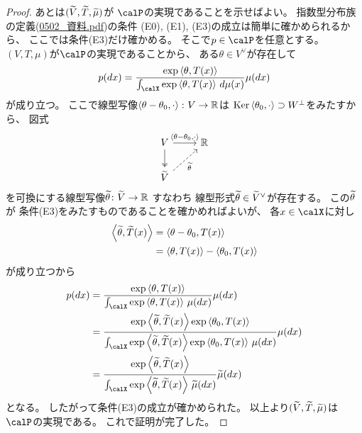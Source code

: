 \documentclass[report]{jlreq}
\begin{document}
\begin{proof}
    あとは$(\widetilde{V}, \widetilde{T}, \widetilde{\mu})$が
    $\calP$の実現であることを示せばよい。
    指数型分布族の定義(\url{0502_資料.pdf})の条件
    (E0), (E1), (E3)の成立は簡単に確かめられるから、
    ここでは条件(E3)だけ確かめる。
    そこで$p \in \calP$を任意とする。
    $(V, T, \mu)$が$\calP$の実現であることから、
    ある$\theta \in V^\vee$が存在して
    \begin{equation}
        p(dx) =
            \frac{
                \exp\myangle{\theta}{T(x)}
            }{
                \int_\calX \exp\myangle{\theta}{T(x)} \, d\mu(x)
            }
            \mu(dx)
    \end{equation}
    が成り立つ。
    ここで線型写像$\left\langle{\theta - \theta_0},{\cdot}\right\rangle \colon V \to \mathbb{R}$は
    $\operatorname{\mathrm{Ker}} \left\langle{\theta_0},{\cdot}\right\rangle \supset W^\perp$をみたすから、
    図式
    \begin{equation}
        \begin{tikzcd}
            V
                \ar[two heads]{d}
                \ar{r}{\myangle{\theta - \theta_0}{\cdot}}
                & \R
                \\
            \wt{V}
                \ar[dashed]{ru}[swap]{\wt{\theta}}
        \end{tikzcd}
    \end{equation}
    を可換にする線型写像$\widetilde{\theta} \colon \widetilde{V} \to \mathbb{R}$
    すなわち
    線型形式$\widetilde{\theta} \in \widetilde{V}^\vee$が存在する。
    この$\widetilde{\theta}$が
    条件(E3)をみたすものであることを確かめればよいが、
    各$x \in \calX$に対し
    \begin{alignat}{1}
        \left\langle{\widetilde{\theta}},{\widetilde{T}(x)}\right\rangle
            &=
                \left\langle{\theta - \theta_0},{T(x)}\right\rangle
                \\
            &=
                \left\langle{\theta},{T(x)}\right\rangle
                -
                \left\langle{\theta_0},{T(x)}\right\rangle
    \end{alignat}
    が成り立つから
    \begin{alignat}{1}
        p(dx)
            &=
                \frac{
                    \exp\myangle{\theta}{T(x)}
                }{
                    \int_\calX
                    \exp\myangle{\theta}{T(x)}
                    \, \mu(dx)
                }
                \mu(dx)
                \\
            &=
                \frac{
                    \exp\myangle{\wt{\theta}}{\wt{T}(x)}
                    \exp\myangle{\theta_0}{T(x)}
                }{
                    \int_\calX 
                    \exp\myangle{\wt{\theta}}{\wt{T}(x)}
                    \exp\myangle{\theta_0}{T(x)}
                    \, \mu(dx)
                }
                \mu(dx)
                \\
            &=
                \frac{
                    \exp\myangle{\wt{\theta}}{\wt{T}(x)}
                }{
                    \int_\calX
                    \exp\myangle{\wt{\theta}}{\wt{T}(x)}
                    \, \wt{\mu}(dx)
                }
                \wt{\mu}(dx)
    \end{alignat}
    となる。
    したがって条件(E3)の成立が確かめられた。
    以上より$(\widetilde{V}, \widetilde{T}, \widetilde{\mu})$は$\calP$の実現である。
    これで証明が完了した。
\end{proof}
\end{document}

